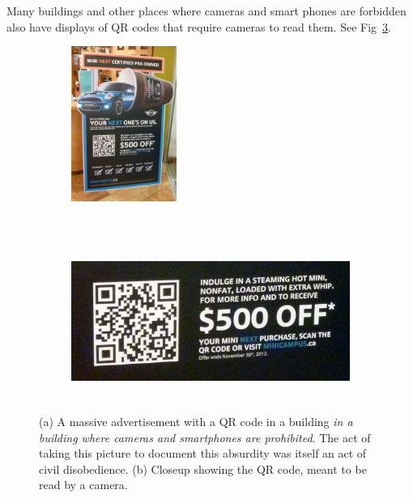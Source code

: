 Many buildings and other places where cameras and smart phones are forbidden
also have displays of QR codes that require cameras to read them.
See Fig~\ref{fig:qr}.

\begin{figure}[t]
\begin{subfigure}[t]{1.5in}
   \centering
    \includegraphics[height=2.0in]{ch6/figs/qr.jpg}
    \caption{}
    \label{subfig:qrwide}
\end{subfigure}
~
\begin{subfigure}[t]{4.0in}
    \includegraphics[height=2.0in]{ch6/figs/qr_closeup.jpg}
    \caption{}
     \label{subfig:qrcloseup}
\end{subfigure}
  \caption{(a) A massive advertisement with a QR code in a building
               {\em in a building where cameras
               and smartphones are prohibited}.
               The act of taking this picture to document this absurdity
               was itself an act of civil disobedience.
           (b) Closeup showing the QR code, meant to be read by a camera.
  }
  \label{fig:qr}
\end{figure}

